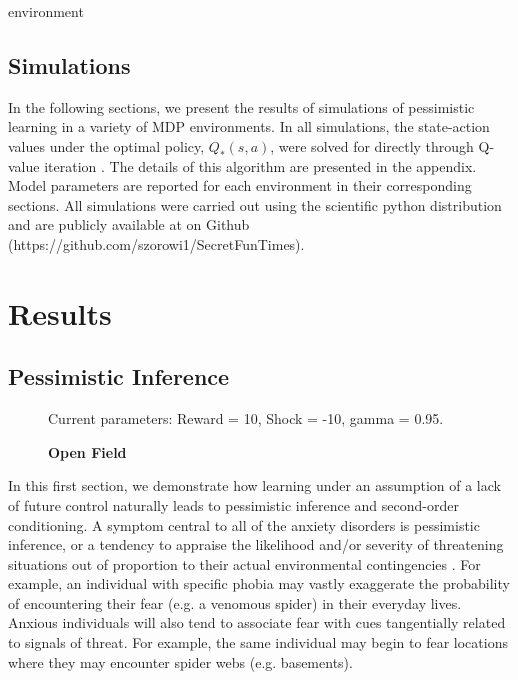 environment\documentclass[11pt]{article} %
\begin{document}
\subsection{Simulations}

In the following sections, we present the results of simulations of pessimistic
learning in a variety of MDP environments. In all simulations, the state-action
values under the optimal policy, $Q_*(s,a)$, were solved for directly through
Q-value iteration \citep{SuttonBarto1998,SuttonBarto1998,bertsekas2005}. The
details of this algorithm are presented in the appendix. Model parameters are
reported for each environment in their corresponding sections. All simulations
were carried out using the scientific python distribution and are publicly available
at on Github (https://github.com/szorowi1/SecretFunTimes).

\section{Results}

\subsection{Pessimistic Inference}

\begin{figure}
  \centerline{%
  }
  \caption{\textbf{Open Field}}
  \par Current parameters: Reward = 10, Shock = -10, gamma = 0.95.
\end{figure}

In this first section, we demonstrate how learning under an assumption of a lack
of future control naturally leads to pessimistic inference and second-order conditioning.
A symptom central to all of the anxiety disorders is pessimistic inference,
or a tendency to appraise the likelihood and/or severity of threatening situations
out of proportion to their actual environmental contingencies \citep{dsm5, BeckClark1997,
ClarkBeck2011}. For example, an individual with specific phobia may vastly exaggerate
the probability of encountering their fear (e.g. a venomous spider) in their
everyday lives. Anxious individuals will also tend to associate fear with cues
tangentially related to signals of threat. For example, the same individual may
begin to fear locations where they may encounter spider webs (e.g. basements).
\end{document}
